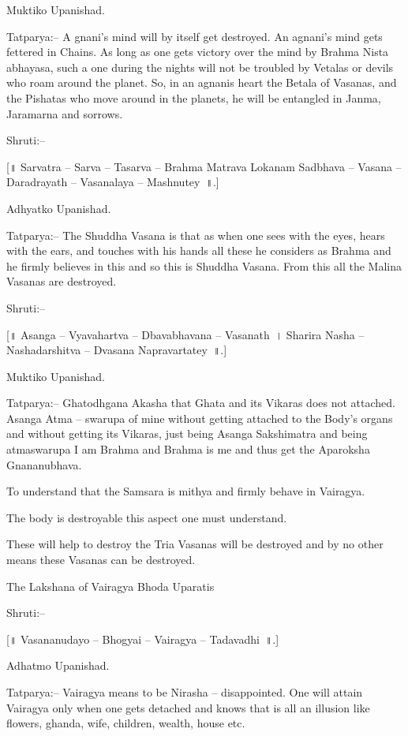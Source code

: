 Muktiko Upanishad.

Tatparya:– A gnani's mind will by itself get destroyed. An agnani's mind gets fettered in Chains. As long as one gets victory over the mind by Brahma Nista abhayasa, such a one during the nights will not be troubled by Vetalas or devils who roam around the planet. So, in an agnanis heart the Betala of Vasanas, and the Pishatas who move around in the planets, he will be entangled in Janma, Jaramarna and sorrows.

Shruti:–

[॥ Sarvatra – Sarva – Tasarva – Brahma Matrava Lokanam Sadbhava – Vasana – Daradrayath – Vasanalaya – Mashnutey~॥.]

Adhyatko Upanishad.

Tatparya:– The Shuddha Vasana is that as when one sees with the eyes, hears with the ears, and touches with his hands all these he considers as Brahma and he firmly believes in this and so this is Shuddha Vasana. From this all the Malina Vasanas are destroyed.

Shruti:–

[॥ Asanga – Vyavahartva – Dbavabhavana – Vasanath~। Sharira Nasha – Nashadarshitva – Dvasana Napravartatey~॥.]

Muktiko Upanishad.

Tatparya:– Ghatodhgana Akasha that Ghata and its Vikaras does not attached. Asanga Atma – swarupa of mine without getting attached to the Body's organs and without getting its Vikaras, just being Asanga Sakshimatra and being atmaswarupa I am Brahma and Brahma is me and thus get the Aparoksha Gnananubhava.

\item To understand that the Samsara is mithya and firmly behave in Vairagya.

 \item The body is destroyable this aspect one must understand.

 \item These will help to destroy the Tria Vasanas will be destroyed and by no other means these Vasanas can be destroyed.


The Lakshana of Vairagya Bhoda Uparatis

Shruti:–

[॥ Vasananudayo – Bhogyai – Vairagya – Tadavadhi~॥.]

Adhatmo Upanishad.

Tatparya:– Vairagya means to be Nirasha – disappointed. One will attain Vairagya only when one gets detached and knows that is all an illusion like flowers, ghanda, wife, children, wealth, house etc.


